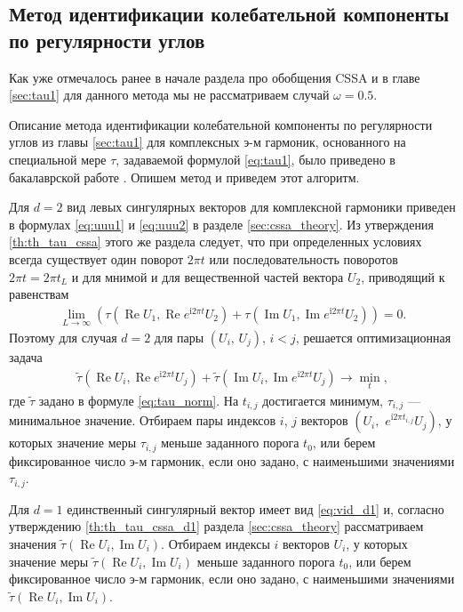 \documentclass[specialist,
               substylefile = spbu.rtx,
               subf,href,colorlinks=true, 12pt]{disser}
\def\RE{\mathop{\mathrm{Re}}}
\def\IM{\mathop{\mathrm{Im}}}
\newcommand{\I}{\mathrm{i}}
\begin{document}
\subsection{Метод идентификации колебательной компоненты по регулярности углов}
\label{sec:tau_cssa}
Как уже отмечалось ранее в начале раздела про обобщения CSSA и в главе \ref{sec:tau1} для данного метода мы не рассматриваем случай $\omega=0.5$.

Описание метода идентификации колебательной компоненты по регулярности углов из главы \ref{sec:tau1} для комплексных э-м гармоник, основанного на специальной мере $\tau$, задаваемой формулой \eqref{eq:tau1}, было приведено в бакалаврской работе \cite{Zhornikova2016}. Опишем метод и приведем этот алгоритм.

Для $d=2$ вид левых сингулярных векторов для комплексной гармоники приведен в формулах \ref{eq:uuu1} и \eqref{eq:uuu2} в разделе \eqref{sec:cssa_theory}.
Из утверждения \ref{th:th_tau_cssa} этого же раздела следует, что при определенных условиях всегда существует один поворот $2\pi t$ или последовательность поворотов $2\pi t = 2\pi t_L$ и для мнимой и для вещественной частей вектора $U_2$, приводящий к равенствам
\begin{gather*}
\lim_{L \rightarrow \infty}({\tau} (\RE U_1, \RE e^{\I 2\pi t} U_2) + {\tau} (\IM U_1, \IM e^{\I 2\pi t} U_2))= 0.
\end{gather*}
Поэтому для случая $d=2$ для пары $(U_i,\,U_j)$, $i<j$, решается оптимизационная задача
\begin{gather} \label{eq:cssa_tau_opt}
 \tilde{\tau}(\RE U_i, \RE e^{\I 2\pi t} U_j) + \tilde{\tau}(\IM U_i, \IM e^{\I 2\pi t} U_j) \longrightarrow \min_{t},
\end{gather}
где $\tilde{\tau}$ задано в формуле \eqref{eq:tau_norm}.
На $t_{i,j}$ достигается минимум, $\tau_{i,j}$ --- минимальное значение.
Отбираем пары индексов $i$, $j$ векторов $\left(U_i, \,\,e^{\mathrm{i} 2\pi t_{i,j}}U_j\right)$, у которых значение меры $\tau_{i,j}$
меньше заданного порога $t_0$, или берем фиксированное число э-м гармоник, если оно задано, с наименьшими значениями $\tau_{i,j}$.

Для $d=1$ единственный сингулярный вектор имеет вид \eqref{eq:vid_d1} и, согласно  утверждению \ref{th:th_tau_cssa_d1} раздела \ref{sec:cssa_theory} рассматриваем значения $\tilde{\tau}(\RE U_i, \IM U_i)$.
Отбираем индексы $i$ векторов $U_i$, у которых значение меры $\tilde{\tau}(\RE U_i, \IM U_i)$
меньше заданного порога $t_0$,
или берем фиксированное число э-м гармоник, если оно задано, с наименьшими значениями $\tilde{\tau}(\RE U_i, \IM U_i)$.
\end{document}

